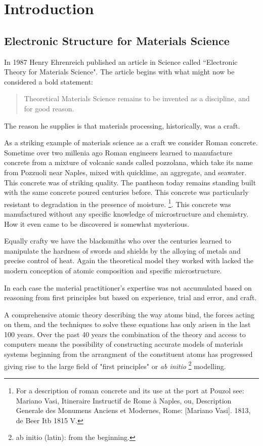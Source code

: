 \chapter{Introduction}
\section{Electronic Structure for Materials Science}
In 1987 Henry Ehrenreich published an article in Science called
``Electronic Theory for Materials Science". The article begins
with what might now be considered a bold statement:

\begin{quote}
Theoretical Materials Science remains to be invented as a discipline, and for good reason.
\end{quote}

The reason he supplies is that materials processing, historically, was a craft. 

As a striking example of materials science as a craft we consider Roman concrete.
Sometime over two millenia ago Roman engineers learned to manufacture concrete 
from a mixture of volcanic sands called pozzolana,
which take its name from Pozzuoli near Naples, mixed with quicklime, an aggregate, and seawater.
This concrete was of striking quality. The pantheon today remains standing 
built with the same concrete poured centuries before.
This concrete was particularly resistant to degradation in the presence of moisture.
\footnote{For a description of roman concrete and its use at the port at Pouzol see: Mariano Vasi, 
Itineraire Instructif de Rome à Naples, ou, Description Generale des Monumens Anciens et Modernes, 
Rome: [Mariano Vasi]. 1813, de Beer Itb 1815 V.}. 
This concrete was manufactured without any specific knowledge of microstructure and 
chemistry. How it even came to be discovered is somewhat mysterious.

Equally crafty we have the blacksmiths who over the centuries learned to manipulate the 
hardness of swords and shields by the alloying of metals and precise control of heat. 
Again the theoretical model they worked with lacked the modern conception of 
atomic composition and specific microstructure.

In each case the material practitioner's expertise was not accumulated based on reasoning 
from first principles but based on experience, trial and error, and craft.

A comprehensive atomic theory describing the way atoms bind, the forces acting on them, 
and the techniques to solve these equations has only arisen in the last 100 years. 
Over the past 40 years the combination of the theory and access to computers 
means the possibility of constructing accurate models of materials 
systems beginning from the arrangment of the constituent atoms has
progressed giving rise to the large field of "first principles" or {\it ab initio}
\footnote{ab initio (latin): from the beginning.} modelling.

